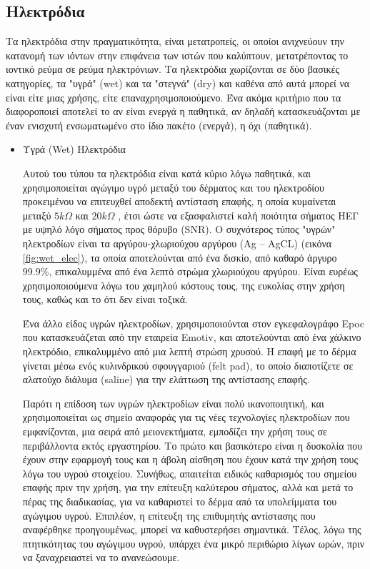 \documentclass[11pt,a4paper,english,greek,twoside]{../Thesis}
\begin{document}
\subsection{Ηλεκτρόδια}
  \par Tα ηλεκτρόδια στην πραγματικότητα, είναι μετατροπείς, οι οποίοι ανιχνεύουν την κατανομή των ιόντων στην επιφάνεια των ιστών που καλύπτουν, μετατρέποντας το ιοντικό ρεύμα σε ρεύμα ηλεκτρόνιων. Τα ηλεκτρόδια χωρίζονται σε δύο βασικές κατηγορίες, τα "υγρά" (wet) και τα "στεγνά" (dry) και καθένα από αυτά μπορεί να είναι είτε μιας χρήσης, είτε επαναχρησιμοποιούμενο. Ένα ακόμα κριτήριο που τα διαφοροποιεί αποτελεί το αν είναι ενεργά η παθητικά, αν δηλαδή κατασκευάζονται με έναν ενισχυτή ενσωματωμένο στο ίδιο πακέτο (ενεργά), η όχι (παθητικά).
\begin{itemize}
    \item{Υγρά (Wet) Ηλεκτρόδια}
    \label{subsec:wet_elec}
    \par Αυτού του τύπου τα ηλεκτρόδια είναι κατά κύριο λόγω παθητικά, και χρησιμοποιείται αγώγιμο υγρό μεταξύ του δέρματος και του ηλεκτροδίου προκειμένου να επιτευχθεί αποδεκτή αντίσταση επαφής, η οποία κυμαίνεται μεταξύ $5kΩ$ και $20kΩ$ \cite{Nunez2006-li}, έτσι ώστε να εξασφαλιστεί καλή ποιότητα σήματος ΗΕΓ με υψηλό λόγο σήματος προς θόρυβο (SNR). Ο συχνότερος τύπος "υγρών" ηλεκτροδίων είναι τα αργύρου-χλωριούχου αργύρου (Ag – AgCL) (εικόνα \ref{fig:wet_elec}), τα οποία αποτελούνται από ένα δισκίο, από καθαρό άργυρο $99.9\% $, επικαλυμμένα από ένα λεπτό στρώμα χλωριούχου αργύρου. Είναι ευρέως χρησιμοποιούμενα λόγω του χαμηλού κόστους τους, της ευκολίας στην χρήση τους, καθώς και το ότι δεν είναι τοξικά.  
    \par Ένα άλλο είδος υγρών ηλεκτροδίων, χρησιμοποιούνται στον εγκεφαλογράφο Epoc που κατασκευάζεται από την εταιρεία Emotiv, και αποτελούνται από ένα χάλκινο ηλεκτρόδιο, επικαλυμμένο από μια λεπτή στρώση χρυσού. Η επαφή με το δέρμα γίνεται μέσω ενός κυλινδρικού σφουγγαριού (felt pad), το οποίο διαποτίζετε σε αλατούχο διάλυμα (saline) για την ελάττωση της αντίστασης επαφής.
    \par Παρότι η επίδοση των υγρών ηλεκτροδίων είναι πολύ ικανοποιητική, και χρησιμοποιείται ως σημείο αναφοράς για τις νέες τεχνολογίες ηλεκτροδίων που εμφανίζονται, μια σειρά από μειονεκτήματα, εμποδίζει την χρήση τους σε περιβάλλοντα εκτός εργαστηρίου. Το πρώτο και βασικότερο είναι η δυσκολία που έχουν στην εφαρμογή τους και η άβολη αίσθηση που έχουν κατά την χρήση τους λόγω του υγρού στοιχείου. Συνήθως, απαιτείται ειδικός καθαρισμός  του σημείου επαφής πριν την χρήση, για την επίτευξη καλύτερου σήματος, αλλά και μετά το πέρας της διαδικασίας, για να καθαριστεί το δέρμα από  τα υπολείμματα του αγώγιμου υγρού. Επιπλέον, η επίτευξη της επιθυμητής αντίστασης που αναφέρθηκε προηγουμένως, μπορεί να καθυστερήσει σημαντικά. Τέλος, λόγω της πτητικότητας του αγώγιμου υγρού, υπάρχει ένα μικρό περιθώριο λίγων ωρών, πριν να ξαναχρειαστεί να το ανανεώσουμε.
    

\end{itemize}
\end{document}
